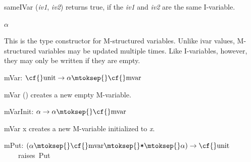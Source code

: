 \begin{descr}
\begin{speccomment}
\item {\cf \small same\-IVar (\mbox{\cf \small \textit{iv1}}, \mbox{\cf \small \textit{iv2}})           } 
returns {\cf \small true}, if the \mbox{\cf \small \textit{iv1}} and \mbox{\cf \small \textit{iv2}} are the 	  same I-variable.     \end{speccomment}
\item {}{} \(\alpha\)~\label{ty-SYNC_VAR.mvar}

\begin{speccomment}
\item 

	This is the type constructor for M-structured variables. 	Unlike {\cf \small ivar} values, M-structured variables may be 	updated multiple times. 	Like I-variables, however, they may only be written if they 	are empty.     \end{speccomment}
\item {}{} {\cf mVar: \(\mbox{\cf{}unit}\rightarrow \alpha\mtoksep{}\mbox{\cf{}mvar}\)}\label{val-SYNC_VAR.mVar}


\begin{speccomment}
\item {\cf \small m\-Var ()           } 
creates a new empty M-variable.     \end{speccomment}
\item {}{} {\cf mVarInit: \(\alpha\rightarrow \alpha\mtoksep{}\mbox{\cf{}mvar}\)}\label{val-SYNC_VAR.mVarInit}


\begin{speccomment}
\item {\cf \small m\-Var x           } 
creates a new M-variable initialized to \mbox{\cf \small \textit{x}}.     \end{speccomment}
\item {}{} {\cf mPut: \((\alpha\mtoksep{}\mbox{\cf{}mvar}\mtoksep{}\verb,*,\mtoksep{}\alpha)\rightarrow \mbox{\cf{}unit}\)}\label{val-SYNC_VAR.mPut}\linebreak[3]\hspace*{\fill}\mbox{~~~~\textrm{raises}~{\cf Put}}



\end{descr}
